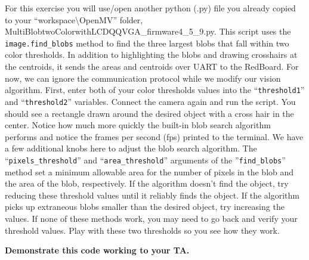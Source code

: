 \documentclass[11pt]{article}
\begin{document}
For this exercise you will use/open another python (.py) file you already copied to your “workspace\textbackslash{}OpenMV” folder, MultiBlobtwoColorwithLCDQQVGA\_firmware4\_5\_9.py. This script uses the \texttt{image.find_blobs} method to find the three largest blobs that fall within two color thresholds. In addition to highlighting the blobs and drawing crosshairs at the centroids, it sends the areas and centroids over UART to the RedBoard. For now, we can ignore the communication protocol while we modify our vision algorithm. First, enter both of your color thresholds values into the “\texttt{threshold1}” and “\texttt{threshold2}” variables. Connect the camera again and run the script. You should see a rectangle drawn around the desired object with a cross hair in the center. Notice how much more quickly the built-in blob search algorithm performs and notice the frames per second (fps) printed to the terminal. We have a few additional knobs here to adjust the blob search algorithm. The “\texttt{pixels_threshold}” and “\texttt{area_threshold}” arguments of the ”\texttt{find_blobs}” method set a minimum allowable area for the number of pixels in the blob and the area of the blob, respectively. If the algorithm doesn’t find the object, try reducing these threshold values until it reliably finds the object. If the algorithm picks up extraneous blobs smaller than the desired object, try increasing the values. If none of these methods work, you may need to go back and verify your threshold values. Play with these two thresholds so you see how they work.
%
\begin{checkoff}
        \textbf{Demonstrate this code working to your TA.}
\end{checkoff}
%
\end{document}
